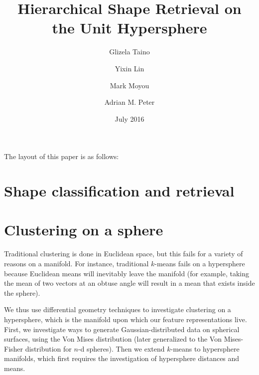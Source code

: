 \documentclass{article}
\begin{document}
\date{July 2016}

\title{Hierarchical Shape Retrieval on the Unit Hypersphere}
\author{Glizela Taino}
\author{Yixin Lin}

\author{Mark Moyou}
\author{Adrian M. Peter}
\setcounter{Maxaffil}{0}
\renewcommand\Affilfont{\small}
\maketitle



The layout of this paper is as follows:

\part{Shape classification and retrieval}
  
  
  
  

\part{Clustering on a sphere}

  Traditional clustering is done in Euclidean space, but this fails for a variety of reasons on a manifold. For instance, traditional $k$-means fails on a hypersphere because Euclidean means will inevitably leave the manifold (for example, taking the mean of two vectors at an obtuse angle will result in a mean that exists inside the sphere).

  We thus use differential geometry techniques to investigate clustering on a hypersphere, which is the manifold upon which our feature representations live. First, we investigate ways to generate Gaussian-distributed data on spherical surfaces, using the Von Mises distribution (later generalized to the Von Mises-Fisher distribution for $n$-d spheres). Then we extend $k$-means to hypersphere manifolds, which first requires the investigation of hypersphere distances and means.
\end{document}
